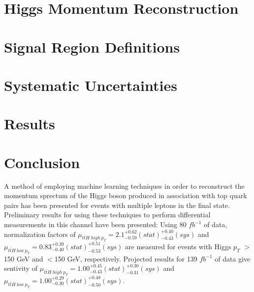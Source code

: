 \documentclass[12pt]{report}	%
\theoremstyle{definition}
\theoremstyle{remark}
\begin{document}

\section{Higgs Momentum Reconstruction}
\label{sec:mva}



\section{Signal Region Definitions}
\label{sec:signal_region}



%


\section{Systematic Uncertainties}
\label{sec:sys}


                                                                
\section{Results}
\label{sec:results}



\section{Conclusion}
\label{part:conclusion}

A method of employing machine learning techniques in order to reconstruct the momentum sprectum of the Higgs boson produced in association with top quark pairs has been presented for events with multiple leptons in the final state. Preliminary results for using these techniques to perform differential measurements in this channel have been presented: Using 80 $fb^{-1}$ of data, normalization factors of $\mu_{t\bar{t}H\ high\ p_T} = 2.1^{+0.62}_{-0.59}(stat)^{+0.40}_{-0.43}(sys)$ and $\mu_{t\bar{t}H\ low\ p_T} = 0.83^{+0.39}_{-0.40}(stat)^{+0.51}_{-0.53}(sys)$ are measured for events with Higgs $p_T$ $>$150 GeV and $<$150 GeV, respectively. Projected results for 139 $fb^{-1}$ of data give sentivity of $\mu_{t\bar{t}H\ high\ p_T} = 1.00^{+0.45}_{-0.43}(stat)^{+0.30}_{-0.31}(sys)$ and $\mu_{t\bar{t}H\ low\ p_T} = 1.00^{+0.29}_{-0.30}(stat)^{+0.48}_{-0.50}(sys)$.
\end{document}
